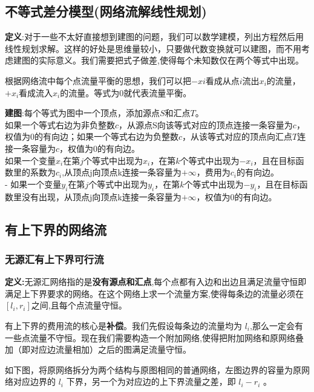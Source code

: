 \documentclass[12pt, a4paper, oneside]{ctexart}
\begin{document}
\subsection{不等式差分模型(网络流解线性规划)}
\textbf{定义}:对于一些不太好直接想到建图的问题，我们可以数学建模，列出方程然后用线性规划求解。这样的好处是思维量较小，只要做代数变换就可以建图，而不用考虑建图的实际意义。我们需要把式子做差,使得每个未知数仅在两个等式中出现。\par
根据网络流中每个点流量平衡的思想，我们可以把$−xi$看成从点$i$流出$x_{i}$的流量，$+x_{i}$看成流入$x_{i}$的流量。等式为$0$就代表流量平衡。\par
\textbf{建图}:每个等式为图中一个顶点，添加源点$S$和汇点$T$。\\
如果一个等式右边为非负整数$c$，从源点S向该等式对应的顶点连接一条容量为$c$，权值为$0$的有向边；如果一个等式右边为负整数$c$，从该等式对应的顶点向汇点$T$连接一条容量为$c$，权值为$0$的有向边。\\
如果一个变量$x_{i}$在第$j$个等式中出现为$x_{i}$，在第$k$个等式中出现为$-x_{i}$，且在目标函数里的系数为$c_{i}$,从顶点j向顶点k连接一条容量为$+\infty$，费用为$c_{i}$的有向边。\\
- 如果一个变量$y_{i}$在第$j$个等式中出现为$y_{i}$，在第$k$个等式中出现为$-y_{i}$，且在目标函数里没有出现，从顶点j向顶点k连接一条容量为$+\infty$，权值为$0$的有向边。


\subsection{有上下界的网络流}
\subsubsection{无源汇有上下界可行流}

\textbf{定义:}无源汇网络指的是\textbf{没有源点和汇点},每个点都有入边和出边且满足流量守恒即满足上下界要求的网络。在这个网络上求一个流量方案,使得每条边的流量必须在$[l_{i},r_{i}]$之间,且每个点流量守恒。\par

有上下界的费用流的核心是\textbf{补偿}。我们先假设每条边的流量均为 $l_{i}$,那么一定会有一些点流量不守恒。现在我们需要构造一个附加网络,使得把附加网络和原网络叠加（即对应边流量相加）之后的图满足流量守恒。\par

如下图，将原网络拆分为两个结构与原图相同的普通网络，左图边界的容量为原网络对应边界的 $l_{i}$ 下界，另一个为对应边的上下界流量之差，即 $l_{i} - r_{i}$ 。
\end{document}
